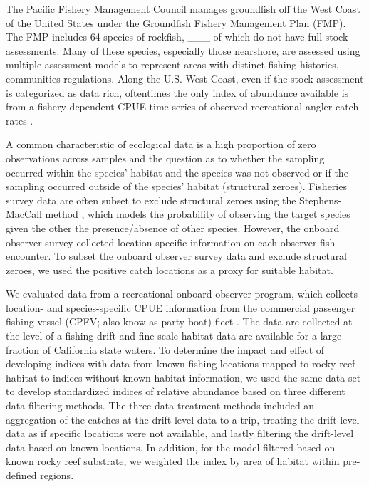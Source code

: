 \documentclass[
  authoryear,
  preprint,
  3p]{elsarticle}
\begin{document}
The Pacific Fishery Management Council manages groundfish off the West
Coast of the United States under the Groundfish Fishery Management Plan
(FMP). The FMP includes 64 species of rockfish, \_\_\_ of which do not
have full stock assessments. Many of these species, especially those
nearshore, are assessed using multiple assessment models to represent
areas with distinct fishing histories, communities regulations. Along
the U.S. West Coast, even if the stock assessment is categorized as data
rich, oftentimes the only index of abundance available is from a
fishery-dependent CPUE time series of observed recreational angler catch
rates \citep{Cope:2013:ISC}.

A common characteristic of ecological data is a high proportion of zero
observations across samples and the question as to whether the sampling
occurred within the species' habitat and the species was not observed or
if the sampling occurred outside of the species' habitat (structural
zeroes). Fisheries survey data are often subset to exclude structural
zeroes using the Stephens-MacCall method
\citeyearpar{Stephens:2004:MAS}, which models the probability of
observing the target species given the other the presence/absence of
other species. However, the onboard observer survey collected
location-specific information on each observer fish encounter. To subset
the onboard observer survey data and exclude structural zeroes, we used
the positive catch locations as a proxy for suitable habitat.

We evaluated data from a recreational onboard observer program, which
collects location- and species-specific CPUE information from the
commercial passenger fishing vessel (CPFV; also know as party boat)
fleet \citep{Monk:2014:DRD}. The data are collected at the level of a
fishing drift and fine-scale habitat data are available for a large
fraction of California state waters. To determine the impact and effect
of developing indices with data from known fishing locations mapped to
rocky reef habitat to indices without known habitat information, we used
the same data set to develop standardized indices of relative abundance
based on three different data filtering methods. The three data
treatment methods included an aggregation of the catches at the
drift-level data to a trip, treating the drift-level data as if specific
locations were not available, and lastly filtering the drift-level data
based on known locations. In addition, for the model filtered based on
known rocky reef substrate, we weighted the index by area of habitat
within pre-defined regions.
\end{document}
